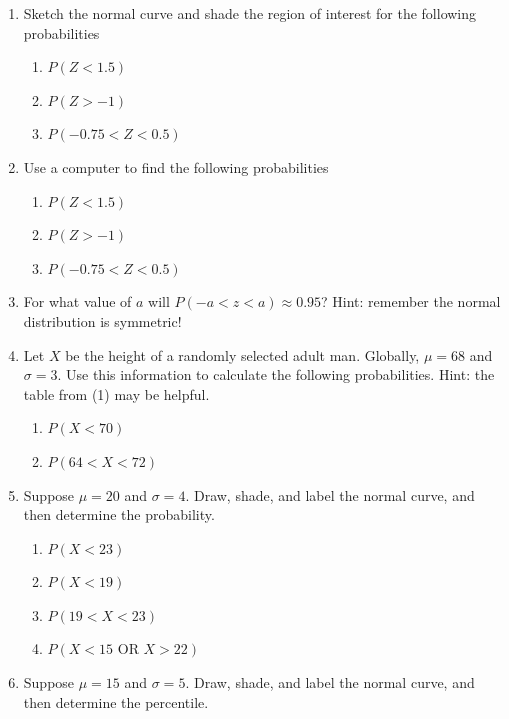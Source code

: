 \documentclass[
]{book}
\providecommand{\tightlist}{%
  \setlength{\itemsep}{0pt}\setlength{\parskip}{0pt}}
\begin{document}
\begin{enumerate}
\def\labelenumi{\arabic{enumi}.}
\setcounter{enumi}{1}
\tightlist
\item
  Sketch the normal curve and shade the region of interest for the following probabilities

  \begin{enumerate}
  \def\labelenumii{\alph{enumii}.}
  \tightlist
  \item
    \(P(Z < 1.5)\)
  \item
    \(P(Z > -1)\)
  \item
    \(P(-0.75 < Z < 0.5)\)
  \end{enumerate}
\item
  Use a computer to find the following probabilities

  \begin{enumerate}
  \def\labelenumii{\alph{enumii}.}
  \tightlist
  \item
    \(P(Z < 1.5)\)
  \item
    \(P(Z > -1)\)
  \item
    \(P(-0.75 < Z < 0.5)\)
  \end{enumerate}
\item
  For what value of \(a\) will \(P(-a < z < a) \approx 0.95\)? Hint: remember the normal distribution is symmetric!
\item
  Let \(X\) be the height of a randomly selected adult man. Globally, \(\mu = 68\) and \(\sigma=3\). Use this information to calculate the following probabilities. Hint: the table from (1) may be helpful.

  \begin{enumerate}
  \def\labelenumii{\alph{enumii}.}
  \tightlist
  \item
    \(P(X < 70)\)
  \item
    \(P(64 < X < 72)\)
  \end{enumerate}
\item
  Suppose \(\mu=20\) and \(\sigma=4\). Draw, shade, and label the normal curve, and then determine the probability.

  \begin{enumerate}
  \def\labelenumii{\alph{enumii}.}
  \tightlist
  \item
    \(P(X < 23)\)
  \item
    \(P(X < 19)\)
  \item
    \(P(19 < X < 23)\)
  \item
    \(P(X < 15 \text{ OR } X > 22)\)
  \end{enumerate}
\item
  Suppose \(\mu=15\) and \(\sigma=5\). Draw, shade, and label the normal curve, and then determine the percentile.


\end{enumerate}
\end{document}
